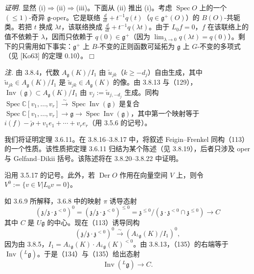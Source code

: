 \emph{证明.} 显然 (i)$\Rightarrow$(ii)$\Rightarrow$(iii)。下面从 (ii) 推出 (i)。考虑 $\operatorname{Spec}O$ 上的一个 $(\le 1)$-奇异 $\mathfrak{g}$-oper。它是联络 $\frac{d}{dt}+t^{-1}q(t)$（$q\in\mathfrak{g}^{+}(O)$）的 $B(O)$-共轭类。若把 $t$ 换成 $\lambda t$，该联络换成 $\frac{d}{dt}+t^{-1}q(\lambda t)$。由于 $L_{0}f=0$，$f$ 在该联络上的值不依赖于 $\lambda$，因而只依赖于 $q(0)\in\mathfrak{g}^{+}$（因为 $\lim_{\lambda\to 0}q(\lambda t)=q(0)$）。剩下的只需用如下事实：$\mathfrak{g}^{+}$ 上 $B$-不变的正则函数可延拓为 $\mathfrak{g}$ 上 $G$-不变的多项式（见 [Ko63] 的定理 0.10）。\hfill$\Box$

 \emph{注.} 由 3.8.4，代数 $A_{\mathfrak{g}}(K)/I_{1}$ 由 $\tilde{u}_{jk}$（$k\ge -d_{j}$）自由生成，其中 $\tilde{u}_{jk}\in A_{\mathfrak{g}}(K)/I_{1}$ 是 $\tilde{u}_{jk}\in A_{\mathfrak{g}}(K)$ 的像。由 3.8.13 与（129），$\operatorname{Inv}(\mathfrak{g})\subset A_{\mathfrak{g}}(K)/I_{1}$ 由 $v_{j}:=\tilde{u}_{j,-d_{j}}$ 生成。同构 $\operatorname{Spec}\mathbb{C}[v_{1},\ldots,v_{r}]\xrightarrow{\sim}\operatorname{Spec}\operatorname{Inv}(\mathfrak{g})$ 是复合 $\operatorname{Spec}\mathbb{C}[v_{1},\ldots,v_{r}]\to\mathfrak{g}\to\operatorname{Spec}\operatorname{Inv}(\mathfrak{g})$，其中第一个映射等于 $i(f)-\check\rho+v_{1}e_{1}+\cdots+v_{r}e_{r}$（用 3.5.6 的记号）。

 我们将证明定理 3.6.11。在 3.8.16--3.8.17 中，将叙述 Feigin--Frenkel 同构（113）的一个性质。该性质把定理 3.6.11 归结为某个陈述（见 3.8.19），后者只涉及 oper 与 Gelfand--Dikii 括号。该陈述将在 3.8.20--3.8.22 中证明。

 沿用 3.5.17 的记号。此外，若 $\operatorname{Der}O$ 作用在向量空间 $V$ 上，则令 $V^{0}:=\{v\in V|L_{0}v=0\}$。

如 3.6.9 所解释，3.6.8 中的映射 $\pi$ 诱导态射
\begin{equation}\tag{134}
  (\mathfrak{z}/\mathfrak{z}\cdot\mathfrak{z}^{<0})^{0}=(\mathfrak{z}/\mathfrak{z}\cdot\mathfrak{z}^{<0})^{\le 0}
  =\mathfrak{z}^{\le 0}/(\mathfrak{z}\cdot\mathfrak{z}^{<0}\cap\mathfrak{z}^{\le 0})\to C
\end{equation}
其中 $C$ 是 $U\mathfrak{g}$ 的中心。现在（113）诱导同构
\begin{equation}\tag{135}
  (\mathfrak{z}/\mathfrak{z}\cdot\mathfrak{z}^{<0})^{0}\xrightarrow{\sim}(A_{{}^{L}\mathfrak{g}}(K)/I_{1})^{0},
\end{equation}
因为由 3.8.5，$I_{1}=A_{{}^{L}\mathfrak{g}}(K)\cdot A_{{}^{L}\mathfrak{g}}(K)^{<0}$。由 3.8.13，（135）的右端等于 $\operatorname{Inv}({}^{L}\mathfrak{g})$。于是（134）与（135）给出态射
\begin{equation}\tag{136}
  \operatorname{Inv}({}^{L}\mathfrak{g})\to C.
\end{equation}

